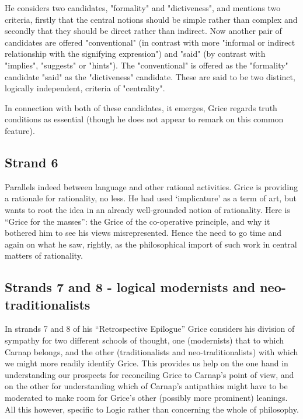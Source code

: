 \documentclass[10pt,titlepage]{book}
\begin{document}
He considers two candidates, "formality" and "dictiveness", and mentions two criteria, firstly that the central notions should be simple rather than complex and secondly that they should be direct rather than indirect. Now another pair of candidates are offered "conventional" (in contrast with more "informal or indirect relationship with the signifying expression") and "said" (by contrast with "implies", "suggests" or "hints"). The "conventional" is offered as the "formality" candidate "said" as the "dictiveness" candidate. These are said to be two distinct, logically independent, criteria of "centrality".

In connection with both of these candidates, it emerges, Grice regards truth conditions as essential (though he does not appear to remark on this common feature). 

\subsection{Strand 6}

Parallels indeed between language and other rational activities.
Grice is providing a rationale for rationality, no less. He had used `implicature' as 
a  term of art, but wants to root the idea in an already well-grounded 
notion of  rationality. Here is ``Grice for the masses'': the Grice of the 
co-operative  principle, and why it bothered him to see his views misrepresented. 
Hence the  need to go time and again on what he saw, rightly, as the 
philosophical import  of such work in central matters of rationality.

\subsection{Strands 7 and 8 - logical modernists and neo-traditionalists}

In strands 7 and 8 of his ``Retrospective Epilogue'' Grice considers his division of sympathy for two different schools of thought, one (modernists) that to which Carnap belongs, and the other (traditionalists and neo-traditionalists) with which we might more readily identify Grice.
This provides us help on the one hand in understanding our prospects for reconciling Grice to Carnap's point of view, and on the other for understanding which of Carnap's antipathies might have to be moderated to make room for Grice's other (possibly more prominent) leanings.
All this however, specific to Logic rather than concerning the whole of philosophy.
\end{document}
